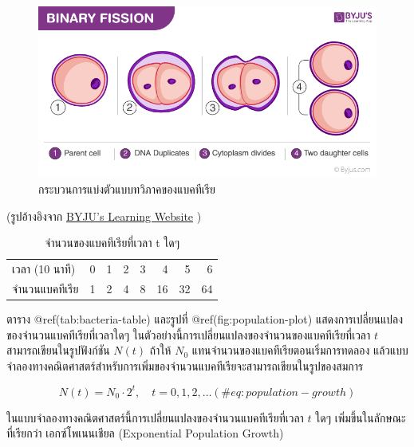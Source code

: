 \documentclass[
]{book}
\begin{document}
\begin{figure}
\includegraphics[width=1\linewidth]{images/fig-binary-fission} \caption{กระบวนการแบ่งตัวแบบทวิภาคของแบคทีเรีย}\label{fig:fig-binary-fission}
\end{figure}

(รูปอ้างอิงจาก \href{https://byjus.com/biology/binary-fission/}{BYJU's
Learning Website} )

\begin{longtable}[]{@{}lrrrrrrr@{}}
\caption{จำนวนของแบคทีเรียที่เวลา t ใดๆ}\tabularnewline
\toprule\noalign{}
\endfirsthead
\endhead
\bottomrule\noalign{}
\endlastfoot
เวลา (10 นาที) & 0 & 1 & 2 & 3 & 4 & 5 & 6 \\
จำนวนแบคทีเรีย & 1 & 2 & 4 & 8 & 16 & 32 & 64 \\
\end{longtable}

ตาราง @ref(tab:bacteria-table) และรูปที่ @ref(fig:population-plot)
แสดงการเปลี่ยนแปลงของจำนวนแบคทีเรียที่เวลาใดๆ
ในตัวอย่างนี้การเปลี่ยนแปลงของจำนวนของแบคทีเรียที่เวลา \(t\) สามารถเขียนในรูปฟังก์ชัน
\(N(t)\) ถ้าให้ \(N_0\) แทนจำนวนของแบคทีเรียตอนเริ่มการทดลอง
แล้วแบบจำลองทางคณิตศาสตร์สำหรับการเพิ่มของจำนวนแบคทีเรียจะสามารถเขียนในรูปของสมการ

\begin{equation}
N(t) = N_0 \cdot 2 ^t, \quad t = 0,1,2, \ldots
(\#eq:population-growth)
\end{equation}

ในแบบจำลองทางคณิตศาสตร์นี้การเปลี่ยนแปลงของจำนวนแบคทีเรียที่เวลา \(t\) ใดๆ
เพิ่มขึ้นในลักษณะที่เรียกว่า เอกซ์โพเนนเชียล (Exponential Population Growth)
\end{document}

